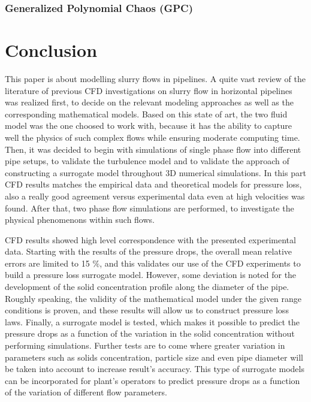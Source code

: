 \documentclass[review,3p,times,12pt]{elsarticle}
\begin{document}
\subsubsection{Generalized Polynomial Chaos (GPC)}




\section{Conclusion} 

This paper is about modelling slurry flows in pipelines. A quite  vast review of the literature of previous CFD investigations on slurry flow in horizontal pipelines was realized first, to decide on the relevant modeling approaches as well as the corresponding mathematical models. Based on this state of art, the two fluid model was the one choosed to work with, because it has the ability to capture well the physics of such complex flows while ensuring moderate computing time. Then, it was decided to begin with simulations of single phase flow into different pipe setups, to validate the turbulence model and to validate the approach of constructing a surrogate model throughout 3D numerical simulations. In this part CFD results matches the empirical data and theoretical models for pressure loss, also a really good agreement versus experimental data even at high velocities was found. After that, two phase flow simulations are performed, to investigate the physical phenomenons within such flows. 

CFD results showed high level correspondence with the presented  experimental data. Starting with the results of the pressure drops, the overall mean relative errors are limited to 15 $ \% $, and this validates our use of the CFD experiments to build a pressure loss surrogate model. However, some deviation is noted for the development of the solid concentration profile along the diameter of the pipe. Roughly speaking, the validity of the mathematical model under the given range conditions is proven, and these results will allow us to construct pressure loss laws. 
Finally, a surrogate model is tested, which makes it possible to predict the pressure drops as a function of the variation in the solid concentration without performing simulations. Further tests are to come where greater variation in parameters such as solids concentration, particle size and even pipe diameter will be taken into account to increase result's accuracy. This type of surrogate models can be incorporated for plant's operators to predict pressure drops as a function of the variation of different flow parameters.
\end{document}
